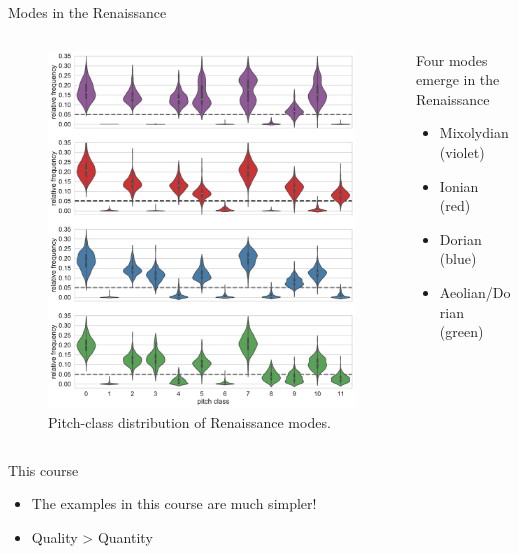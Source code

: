 \begin{frame}{Modes in the Renaissance}
    \begin{columns}
        \begin{column}{.6\linewidth}
            \begin{figure}
                \centering
                \includegraphics[width=\linewidth,height=.8\textheight,keepaspectratio]{_images/Figure7.pdf}
                \caption{Pitch-class distribution of Renaissance modes.}
            \end{figure}
        \end{column}
        \hfill
        \begin{column}{.4\linewidth}
            Four modes emerge in the Renaissance
            
            \begin{itemize}
                \item Mixolydian (violet)
                \item Ionian (red)
                \item Dorian (blue)
                \item Aeolian/Dorian (green)
            \end{itemize}
        \end{column}
    \end{columns}
\end{frame}

\begin{frame}{This course}
    \begin{itemize}
        \item The examples in this course are much simpler!
        \item Quality > Quantity
    \end{itemize}
\end{frame}